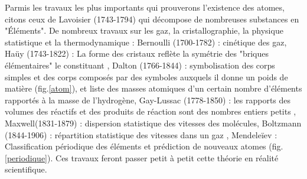  Parmis les travaux les plus importants qui prouverons l'existence des atomes, citons ceux de Lavoisier (1743-1794) qui décompose de nombreuses substances en "Éléments". De nombreux travaux sur les gaz, la cristallographie, la physique statistique et la thermodynamique : Bernoulli (1700-1782) : cinétique des gaz, Haüy (1743-1822) : La forme des cristaux reflète la symétrie des "briques élémentaires" le constituant , Dalton (1766-1844) : symbolisation des corps simples et des corps composés par des symboles auxquels il donne un poids de matière (fig.\ref{atom}), et liste des masses atomiques d'un certain nombre d'éléments rapportés à la masse de l'hydrogène, Gay-Lussac (1778-1850) : les rapports des volumes des réactifs et des produits de réaction sont des nombres entiers petits , Maxwell(1831-1879) : dispersion statistique des vitesses des molécules, Boltzmann (1844-1906) : répartition statistique des vitesses dans un gaz , Mendeleïev : Classification périodique des éléments et prédiction de nouveaux atomes (fig.\ref{periodique}). Ces travaux feront passer petit à petit cette théorie en réalité scientifique. 
 
